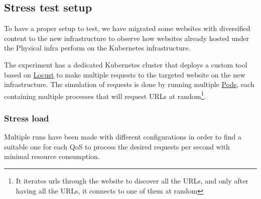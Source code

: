 



\subsection{Stress test setup}

To have a proper setup to test, we have migrated some websites with diversified content to the new infrastructure to observe how websites already hosted under the Physical infra perform on the Kubernetes infrastructure.



The experiment has a dedicated Kubernetes cluster that deploys a custom tool based on \hyperlink{locust.io}{Locust} to make multiple requests to the targeted website on the new infrastructure. 
The simulation of requests is done by running multiple \hyperlink{https://kubernetes.io/docs/concepts/workloads/pods/}{Pods}, each containing multiple processes that will request URLs at random\footnote{It iterates urls through the website to discover all the URLs, and only after having all the URLs, it connects to one of them at random}.

\subsubsection{Stress load}
Multiple runs have been made with different configurations in order to find a suitable one for each QoS to process the desired requests per second with minimal resource consumption.

